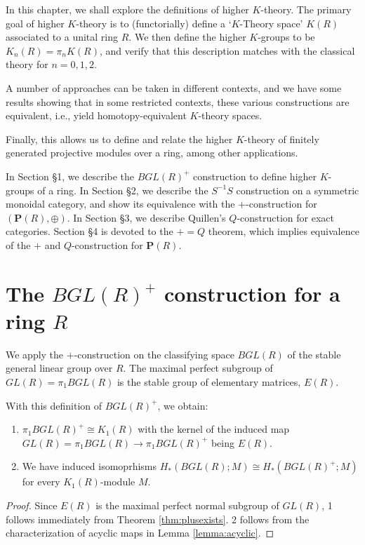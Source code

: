 In this chapter, we shall explore the definitions of higher $K$-theory.
The primary goal of higher $K$-theory is to (functorially) define a `$K$-Theory space' $K(R)$ associated to a unital ring $R$.
We then define the higher $K$-groups to be $K_n(R) = \pi_nK(R)$, and verify
that this description matches with the classical theory for $n = 0, 1, 2$.

A number of approaches can be taken in different contexts, and we have some results showing that in
some restricted contexts, these various constructions are equivalent, i.e., yield homotopy-equivalent $K$-theory spaces.

Finally, this allows us to define and relate the higher $K$-theory of finitely generated projective modules over a ring, among other applications.

In Section \S1, we describe the $BGL(R)^+$ construction to define higher $K$-groups of a ring.
In Section \S2, we describe the $S^{-1}S$ construction on a symmetric monoidal category,
and show its equivalence with the $+$-construction for $(\mathbf{P}(R), \oplus)$.
In Section \S3, we describe Quillen's $Q$-construction for exact categories.
Section \S4 is devoted to the $+=Q$ theorem, which implies equivalence of the $+$ and $Q$-construction for $\mathbf{P}(R)$.

\section{The $BGL(R)^+$ construction for a ring $R$}\label{sec:BGL(R)plus}
We apply the $+$-construction on the classifying space $BGL(R)$ of the stable general linear group over $R$.
The maximal perfect subgroup of $GL(R) = \pi_1BGL(R)$ is the stable group of elementary matrices, $E(R)$.

\begin{theorem}
With this definition of $BGL(R)^+$, we obtain:
\begin{enumerate}
\item $\pi_1BGL(R)^+ \cong K_1(R)$ with the kernel of the induced map $GL (R) = \pi_1BGL(R) \to \pi_1BGL(R)^+$ being $E(R)$.
\item We have induced isomoprhisms $H_*(BGL(R);M) \cong H_*(BGL(R)^+;M)$ for every $K_1(R)$-module $M$.
\end{enumerate}
\end{theorem}
\begin{proof}
Since $E(R)$ is the maximal perfect normal subgroup of $GL(R)$, 1 follows immediately from Theorem \ref{thm:plusexists}. 2 follows from the characterization of acyclic maps in Lemma \ref{lemma:acyclic}.
\end{proof}

